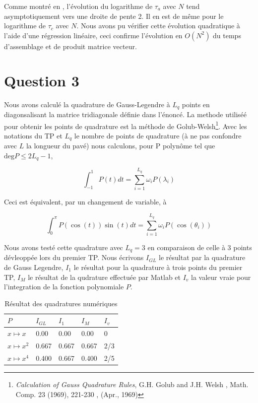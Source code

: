 \documentclass[10pt]{article}
\begin{document}
\begin{multicols}{2}
Comme montré en , l'évolution du logarithme de $\tau_a$ avec $N$ tend asymptotiquement vers une droite de pente 2. Il en est de même pour le logarithme de $\tau_c$ avec $N$. Nous avons pu vérifier cette évolution quadratique à l'aide d'une régression linéaire, ceci confirme l'évolution en $O(N^{2})$ du temps d'assemblage et de produit matrice vecteur.







\vspace*{22pt}

\section*{Question 3}

Nous avons calculé la quadrature de Gauss-Legendre à $L_q$ points en diagonsalisant la matrice tridiagonale définie dans l'énoncé. La methode utiliséé pour obtenir les points de quadrature est la méthode de Golub-Welsh\footnote{\textit{Calculation of Gauss Quadrature Rules}, G.H. Golub and J.H. Welsh \color{cyan}, Math. Comp. 23 (1969), 221-230 \color{black}, (Apr., 1969)}. Avec les notations du TP et $L_q$ le nombre de points de quadrature (à ne pas confondre avec $L$ la longueur du pavé) nous calculons, pour P polynôme tel que $\text{deg}P \le 2L_q-1$,

\begin{equation}
	\int_{-1}^{1}{P(t)dt} = \sum_{i=1}^{L_q}{\omega_i P(\lambda_i)}
\end{equation}

Ceci est équivalent, par un changement de variable, à

\begin{equation}
	\int_{0}^{\pi}{P(\cos(t))\sin(t)dt} = \sum_{i=1}^{L_q}{\omega_i P(\cos(\theta_i))}
\end{equation}

Nous avons testé cette quadrature avec $L_q = 3$ en comparaison de celle à 3 points dévleoppée lors du premier TP. Nous écrivons $I_{GL}$ le résultat par la quadrature de Gauss Legendre, $I_{1}$ le résultat pour la quadrature à trois points du premier TP, $I_{M}$ le résultat de la qudrature effectuée par Matlab et $I_v$ la valeur vraie pour l'integration de la fonction polynomiale $P$.

\begin{table}[H]
\centering
\begin{tabular}{m{2cm} |m{1cm} m{1cm} m{1cm} m{1cm}} 
   \hline
    \centering $P$ & $I_{GL}$ & $I_{1}$ & $I_{M}$ & $I_v$ \\
    \toprule
    \toprule
    $x \mapsto x$      & 0.00 & 0.00 & 0.00 & 0 \\
    $x \mapsto x^{2}$  & 0.667 & 0.667 & 0.667 & 2/3 \\
    $x \mapsto x^{4}$  & 0.400 & 0.667 & 0.400 & 2/5 \\
    \hline
\end{tabular}
\caption{Résultat des quadratures numériques}
\end{table}


\end{multicols}
\end{document}
